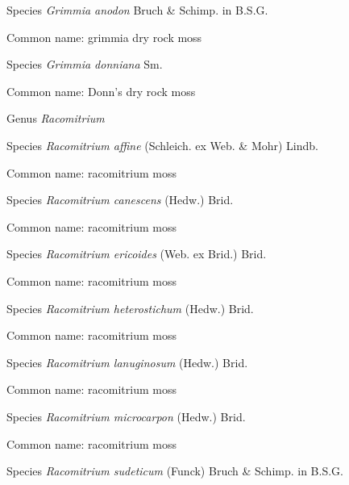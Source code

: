 \documentclass[9pt, article]{memoir}
\begin{document}
\begin{multicols}{2}
\vspace{6pt}\noindent\hspace{36pt}Species \textit{Grimmia anodon} Bruch \& Schimp. in B.S.G.


Common name: grimmia dry rock moss

\vspace{6pt}\noindent\hspace{36pt}Species \textit{Grimmia donniana} Sm.


Common name: Donn's dry rock moss

\vspace{6pt}\noindent\hspace{30pt}Genus \textit{Racomitrium}


\vspace{6pt}\noindent\hspace{36pt}Species \textit{Racomitrium affine} (Schleich. ex Web. \& Mohr) Lindb.


Common name: racomitrium moss

\vspace{6pt}\noindent\hspace{36pt}Species \textit{Racomitrium canescens} (Hedw.) Brid.


Common name: racomitrium moss

\vspace{6pt}\noindent\hspace{36pt}Species \textit{Racomitrium ericoides} (Web. ex Brid.) Brid.


Common name: racomitrium moss

\vspace{6pt}\noindent\hspace{36pt}Species \textit{Racomitrium heterostichum} (Hedw.) Brid.


Common name: racomitrium moss

\vspace{6pt}\noindent\hspace{36pt}Species \textit{Racomitrium lanuginosum} (Hedw.) Brid.


Common name: racomitrium moss

\vspace{6pt}\noindent\hspace{36pt}Species \textit{Racomitrium microcarpon} (Hedw.) Brid.


Common name: racomitrium moss

\vspace{6pt}\noindent\hspace{36pt}Species \textit{Racomitrium sudeticum} (Funck) Bruch \& Schimp. in B.S.G.



\end{multicols}
\end{document}
